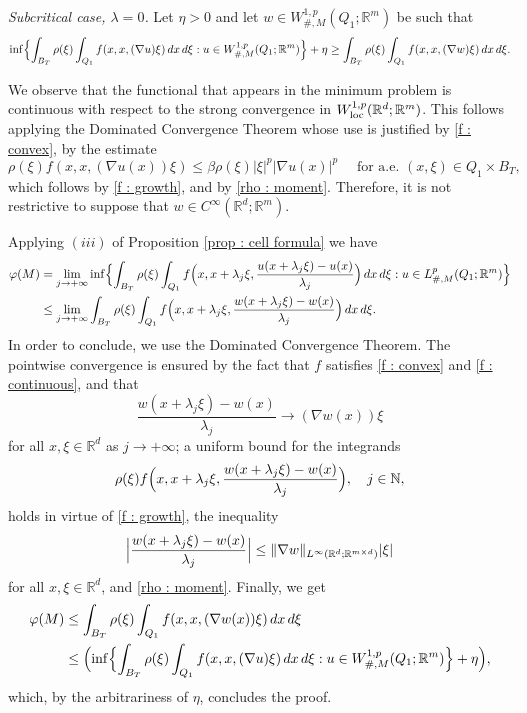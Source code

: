\documentclass{article}
\theoremstyle{definition}
\newcommand{\f}{\varphi}
\newcommand{\N}{\mathbb{N}}
\newcommand{\R}{\mathbb{R}}
\begin{document}
\medskip

{\em Subcritical case, $\lambda=0$.} Let $\eta>0$ and let $w\in W_{\#,M}^{1,p}(Q_1; \R^m)$ be such that
    \begin{equation*}
      \inf\Bigl\{ \int_{B_T} \rho(\xi)\int_{Q_1} f(x,x,(\nabla u)\xi)\, dx\,d\xi : u\in W^{1,p}_{\#,M}(Q_1; \R^m) \Bigr\} + \eta \geq  \int_{B_T} \rho(\xi)\int_{Q_1} f(x,x,(\nabla w)\xi)\, dx\,d\xi.
    \end{equation*} 

We observe that the functional that appears in the minimum problem is continuous with respect to the strong convergence in $W_{\rm loc}^{1,p}(\R^d;\R^m)$. This follows applying the Dominated Convergence Theorem whose use is justified by \eqref{f : convex}, by the estimate
    \begin{equation}\label{forDCT}
       \rho(\xi) f(x,x,(\nabla u(x))\xi) \leq \beta \rho(\xi)|\xi|^p|\nabla u(x)|^p \quad \text{ for a.e. } (x,\xi)\in Q_1\times B_T,
    \end{equation}
which follows by \eqref{f : growth}, and by \eqref{rho : moment}. Therefore, it is not restrictive to suppose that $w\in C^\infty(\R^d;\R^m)$.

Applying $(iii)$ of Proposition \ref{prop : cell formula} we have
\begin{align*}
    \f(M) & = \lim_{j\to+\infty} \inf\Bigl\{ \int_{B_T} \rho(\xi)\int_{Q_1} f\Bigl(x,x+\lambda_j\xi,\frac{u(x+\lambda_j\xi)-u(x)}{\lambda_j}\Bigr)\, dx\,d\xi : u\in L^p_{\#,M}(Q_1;\R^m) \Bigr\} \\
    & \leq \lim_{j\to+\infty} \int_{B_T} \rho(\xi)\int_{Q_1} f\Bigl(x,x+\lambda_j\xi,\frac{w(x+\lambda_j\xi)-w(x)}{\lambda_j}\Bigr)\, dx\,d\xi.
\end{align*}
In order to conclude, we use the Dominated Convergence Theorem. The pointwise convergence is ensured by the fact that $f$ satisfies \eqref{f : convex} and \eqref{f : continuous}, and that
\begin{equation*}
    \frac{w(x+\lambda_j\xi)-w(x)}{\lambda_j} \to (\nabla w(x)) \xi
\end{equation*}
for all $x,\xi\in\R^d$ as $j\to+\infty$; a uniform bound for the integrands 
\begin{equation*}
    \rho(\xi) f\Bigl(x,x+\lambda_j\xi,\frac{w(x+\lambda_j\xi)-w(x)}{\lambda_j}\Bigr), \quad j\in\N,
\end{equation*}
holds in virtue of \eqref{f : growth}, the inequality
\begin{equation}\label{quotient}
    \Bigl|\frac{w(x+\lambda_j\xi)-w(x)}{\lambda_j}\Bigr| \leq \|\nabla w\|_{L^\infty(\R^d;\R^{m\times d})}|\xi|
\end{equation}
for all $x,\xi\in\R^d$, and \eqref{rho : moment}. Finally, we get
\begin{align*}
     \f(M)  & \leq \int_{B_T} \rho(\xi)\int_{Q_1} f(x,x,(\nabla w(x)) \xi)\, dx\,d\xi \\
     & \leq \Bigl(\inf\Bigl\{ \int_{B_T} \rho(\xi)\int_{Q_1} f(x,x,(\nabla u) \xi)\, dx\,d\xi : u\in W^{1,p}_{\#,M}(Q_1; \R^m) \Bigr\}  +\eta\Bigr),
\end{align*}
     which, by the arbitrariness of $\eta$, concludes the proof.
\end{document}
